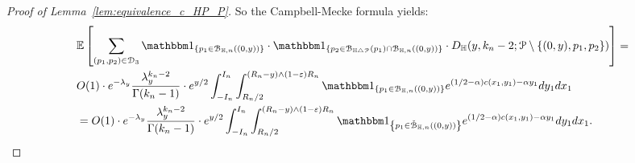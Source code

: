 \begin{proof}[Proof of Lemma~\ref{lem:equivalence_c_HP_P}]
So the Campbell-Mecke formula yields: 
\begin{equation}
\begin{split}
&{\mathbb E} \left[  \sum_{(p_1, p_2)\in \dom{3}} \ind{p_1 \in \BallHyp{(0,y)}} \cdot \ind{p_2 \in \BallSym{p_1}\cap \BallHyp{(0,y)}} \cdot D_\H (y,k_n-2;\Pcal \setminus \{ (0,y),p_1,p_2\})  \right] = \\
&O(1)\cdot e^{-\lambda_y}  \frac{\lambda_y^{k_n-2}}{\Gamma (k_n-1)}  \cdot e^{y/2} \int_{-I_n}^{I_n} \int_{R_n/2}^{(R_n - y) \wedge (1-\eps)R_n}  
\ind{p_1 \in \BallHyp{(0,y)}}
e^{(1/2 -\alpha) c(x_1,y_1) - \alpha y_1} dy_1dx_1 \\
&= O(1) \cdot e^{-\lambda_y}  \frac{\lambda_y^{k_n-2}}{\Gamma (k_n-1)}\cdot e^{y/2} \int_{-I_n}^{I_n} \int_{R_n/2}^{(R_n - y) \wedge (1-\eps)R_n}  
\ind{p_1 \in \FatBallHyp{(0,y)}}
e^{(1/2 -\alpha) c(x_1,y_1) - \alpha y_1} dy_1dx_1.
\end{split}
\end{equation}





\end{proof}
